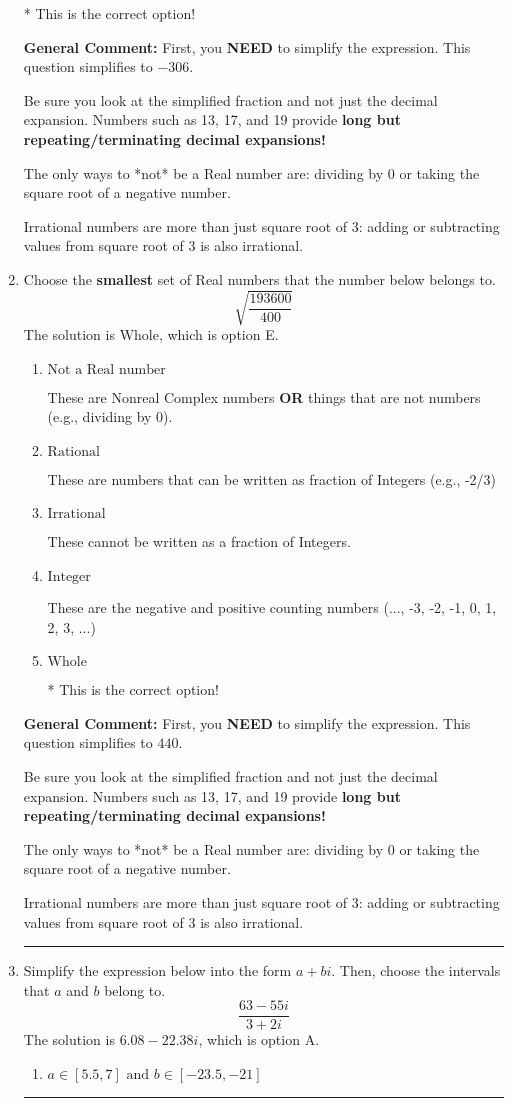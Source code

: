 \documentclass{extbook}[14pt]
\newcommand{\litem}[1]{\item #1

\rule{\textwidth}{0.4pt}}
\begin{document}
\begin{enumerate}
{\begin{enumerate}[label=\Alph*.]
* This is the correct option!
\end{enumerate}

\textbf{General Comment:} First, you \textbf{NEED} to simplify the expression. This question simplifies to $-306$. 
 
 Be sure you look at the simplified fraction and not just the decimal expansion. Numbers such as 13, 17, and 19 provide \textbf{long but repeating/terminating decimal expansions!} 
 
 The only ways to *not* be a Real number are: dividing by 0 or taking the square root of a negative number. 
 
 Irrational numbers are more than just square root of 3: adding or subtracting values from square root of 3 is also irrational.
}
\litem{
Choose the \textbf{smallest} set of Real numbers that the number below belongs to.
\[ \sqrt{\frac{193600}{400}} \]The solution is \( \text{Whole} \), which is option E.\begin{enumerate}[label=\Alph*.]
\item \( \text{Not a Real number} \)

These are Nonreal Complex numbers \textbf{OR} things that are not numbers (e.g., dividing by 0).
\item \( \text{Rational} \)

These are numbers that can be written as fraction of Integers (e.g., -2/3)
\item \( \text{Irrational} \)

These cannot be written as a fraction of Integers.
\item \( \text{Integer} \)

These are the negative and positive counting numbers (..., -3, -2, -1, 0, 1, 2, 3, ...)
\item \( \text{Whole} \)

* This is the correct option!
\end{enumerate}

\textbf{General Comment:} First, you \textbf{NEED} to simplify the expression. This question simplifies to $440$. 
 
 Be sure you look at the simplified fraction and not just the decimal expansion. Numbers such as 13, 17, and 19 provide \textbf{long but repeating/terminating decimal expansions!} 
 
 The only ways to *not* be a Real number are: dividing by 0 or taking the square root of a negative number. 
 
 Irrational numbers are more than just square root of 3: adding or subtracting values from square root of 3 is also irrational.
}
\litem{
Simplify the expression below into the form $a+bi$. Then, choose the intervals that $a$ and $b$ belong to.
\[ \frac{63 - 55 i}{3 + 2 i} \]The solution is \( 6.08  - 22.38 i \), which is option A.\begin{enumerate}[label=\Alph*.]
\item \( a \in [5.5, 7] \text{ and } b \in [-23.5, -21] \)


\end{enumerate}}
\end{enumerate}
\end{document}

